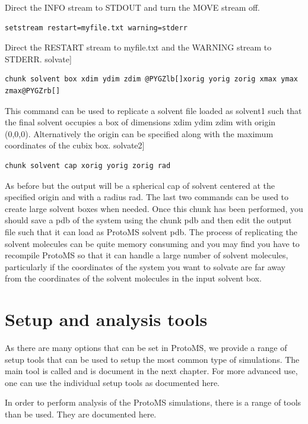 \documentclass[letterpaper,10pt,english]{manual}
\begin{document}
Direct the INFO stream to STDOUT and turn the MOVE stream off.

\begin{Verbatim}[commandchars=@\[\]]
setstream restart=myfile.txt warning=stderr
\end{Verbatim}

Direct the RESTART stream to myfile.txt and the WARNING stream to STDERR. solvate{]}
\begin{Verbatim}[commandchars=@\[\]]
chunk solvent box xdim ydim zdim @PYGZlb[]xorig yorig zorig xmax ymax zmax@PYGZrb[]
\end{Verbatim}

This command can be used to replicate a solvent file loaded as solvent1 such that the final solvent occupies a box of dimensions xdim ydim zdim with origin (0,0,0). Alternatively the origin can be specified along with the maximum coordinates of the cubix box. solvate2{]}

\begin{Verbatim}[commandchars=@\[\]]
chunk solvent cap xorig yorig zorig rad
\end{Verbatim}

As before but the output will be a spherical cap of solvent centered at the specified origin and with a radius rad. The last two commands can be used to create large solvent boxes when needed. Once this chunk has been performed, you should save a pdb of the system using the chunk pdb and then edit the output file such that it can load as ProtoMS solvent pdb. The process of replicating the solvent molecules can be quite memory consuming and you may find you have to recompile ProtoMS so that it can handle a large number of solvent molecules, particularly if the coordinates of the system you want to solvate are far away from the coordinates of the solvent molecules in the input solvent box.


\section{Setup and analysis tools}

As there are many options that can be set in ProtoMS, we provide a range of setup tools that can be used to setup the most common type of simulations. The main tool is called  and is document in the next chapter. For more advanced use, one can use the individual setup tools as documented here.

In order to perform analysis of the ProtoMS simulations, there is a range of tools than be used. They are documented here.
\end{document}
